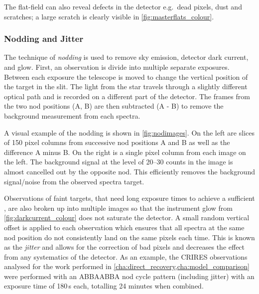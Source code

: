 The flat-field can also reveal defects in the detector e.g.\ dead pixels, dust and scratches; a large scratch is clearly visible in \cref{fig:masterflats_colour}.

\subsubsection{Nodding and Jitter}
\label{subsec:nod-jitter}
The technique of \emph{nodding} is used to remove sky emission, detector dark current, and glow.
First, an observation is divide into multiple separate exposures.
Between each exposure the telescope is moved to change the vertical position of the target in the slit.
The light from the star travels through a slightly different optical path and is recorded on a different part of the detector.
The frames from the two nod positions (A, B) are then subtracted (A - B) to remove the background measurement from each spectra.

A visual example of the nodding is shown in \cref{fig:nodimages}.
On the left are slices of 150 pixel columns from successive nod positions A and B as well as the difference A minus B.
On the right is a single pixel column from each image on the left.
The background signal at the level of 20--30 counts in the image is almost cancelled out by the opposite nod.
This efficiently removes the background signal/noise from the observed spectra target.

Observations of faint targets, that need long exposure times to achieve a sufficient \snr{}, are also broken up into multiple images so that the instrument glow from \cref{fig:darkcurrent_colour} does not saturate the detector.
A small random vertical offset is applied to each observation which ensures that all spectra at the same nod position do not consistently land on the same pixels each time.
This is known as the \emph{jitter} and allows for the correction of bad pixels and decreases the effect from any systematics of the detector.
As an example, the {CRIRES} observations analysed for the work performed in \cref{cha:direct_recovery,cha:model_comparison} were performed with an {ABBAABBA} nod cycle pattern (including jitter) with an exposure time of 180\,\si{\second} each, totalling 24 minutes when combined.

